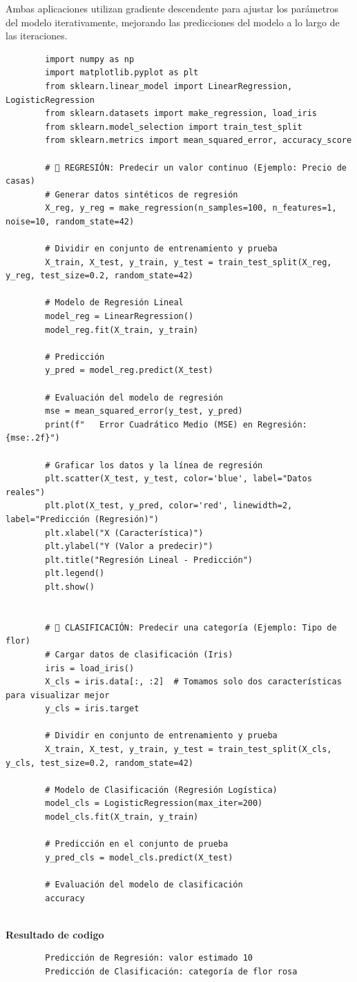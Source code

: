 \documentclass{article}
\begin{document}
	Ambas aplicaciones utilizan gradiente descendente para ajustar los parámetros del modelo iterativamente, mejorando las predicciones del modelo a lo largo de las iteraciones.
	
	\begin{verbatim}
		import numpy as np
		import matplotlib.pyplot as plt
		from sklearn.linear_model import LinearRegression, LogisticRegression
		from sklearn.datasets import make_regression, load_iris
		from sklearn.model_selection import train_test_split
		from sklearn.metrics import mean_squared_error, accuracy_score
		
		# ⿡ REGRESIÓN: Predecir un valor continuo (Ejemplo: Precio de casas)
		# Generar datos sintéticos de regresión
		X_reg, y_reg = make_regression(n_samples=100, n_features=1, noise=10, random_state=42)
		
		# Dividir en conjunto de entrenamiento y prueba
		X_train, X_test, y_train, y_test = train_test_split(X_reg, y_reg, test_size=0.2, random_state=42)
		
		# Modelo de Regresión Lineal
		model_reg = LinearRegression()
		model_reg.fit(X_train, y_train)
		
		# Predicción
		y_pred = model_reg.predict(X_test)
		
		# Evaluación del modelo de regresión
		mse = mean_squared_error(y_test, y_pred)
		print(f"   Error Cuadrático Medio (MSE) en Regresión: {mse:.2f}")
		
		# Graficar los datos y la línea de regresión
		plt.scatter(X_test, y_test, color='blue', label="Datos reales")
		plt.plot(X_test, y_pred, color='red', linewidth=2, label="Predicción (Regresión)")
		plt.xlabel("X (Característica)")
		plt.ylabel("Y (Valor a predecir)")
		plt.title("Regresión Lineal - Predicción")
		plt.legend()
		plt.show()
		
		
		# ⿢ CLASIFICACIÓN: Predecir una categoría (Ejemplo: Tipo de flor)
		# Cargar datos de clasificación (Iris)
		iris = load_iris()
		X_cls = iris.data[:, :2]  # Tomamos solo dos características para visualizar mejor
		y_cls = iris.target
		
		# Dividir en conjunto de entrenamiento y prueba
		X_train, X_test, y_train, y_test = train_test_split(X_cls, y_cls, test_size=0.2, random_state=42)
		
		# Modelo de Clasificación (Regresión Logística)
		model_cls = LogisticRegression(max_iter=200)
		model_cls.fit(X_train, y_train)
		
		# Predicción en el conjunto de prueba
		y_pred_cls = model_cls.predict(X_test)
		
		# Evaluación del modelo de clasificación
		accuracy
		
		\end{verbatim}
		\textbf{Resultado de codigo}
		\begin{verbatim}
		Predicción de Regresión: valor estimado 10
		Predicción de Clasificación: categoría de flor rosa
		\end{verbatim}
		\\
\end{document}
